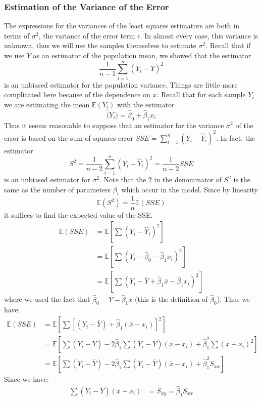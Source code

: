 \documentclass[12pt]{article}
\theoremstyle{definition}
\theoremstyle{remark}
\def\E{{\mathbb E}}
\begin{document}
\subsubsection{Estimation of the Variance of the Error}
The expressions for the variances of the least squares estimators are both in terms of $\sigma^2$, the variance of the error term $\epsilon$. In almost every case, this variance is unknown, thus we will use the samples themselves to estimate $\sigma^2$. Recall that if we use $\bar{Y}$ as an estimator of the population mean, we showed that the estimator
\[
\frac{1}{n-1} \sum_{i=1}^n (Y_i - \bar{Y})^2
\] 
is an unbiased estimator for the population variance. Things are little more complicated here because of the dependence on $x$. Recall that for each sample $Y_i$ we are estimating the mean $\E(Y_i)$ with the estimator
\[
\hat(Y_i) = \hat{\beta}_0 + \hat{\beta}_1 x_i
\]
Thus it seems reasonable to suppose that an estimator for the variance $\sigma^2$ of the error is based on the sum of squares error $SSE = \sum_{i=1}^n (Y_i - \hat{Y}_i)^2$. In fact, the estimator
\[
S^2 = \frac{1}{n-2} \sum_{i=1}^n (Y_i - \hat{Y}_i)^2 = \frac{1}{n-2} SSE
\]
is an unbiased estimator for $\sigma^2$. Note that the 2 in the denominator of $S^2$ is the same as the number of parameters $\beta_i$ which occur in the model. Since by linearity
\[
\E(S^2) = \frac{1}{n} \E(SSE)
\]
it suffices to find the expected value of the SSE.
\begin{align*}
\E(SSE) &= \E \left[ \sum (Y_i - \hat{Y}_i)^2 \right] \\
&= \E \left[ \sum (Y_i - \hat{\beta}_0 - \hat{\beta}_1 x_i)^2 \right] \\
&= \E \left[ \sum (Y_i - \bar{Y} + \hat{\beta}_1 \bar{x} - \hat{\beta}_1 x_i)^2 \right]
\end{align*}
where we used the fact that $\hat{\beta}_0 = \bar{Y} - \hat{\beta}_1 \bar{x}$ (this is the definition of $\hat{\beta}_0$). Thus we have:
\begin{align*}
\E(SSE) &= \E \left[ \sum [(Y_i - \bar{Y}) + \hat{\beta}_1( \bar{x} - x_i)]^2 \right]\\
&= \E\left[ \sum(Y_i - \bar{Y}) - 2 \hat{\beta}_1 \sum(Y_i - \bar{Y})( \bar{x} - x_i) + \hat{\beta}_1^2\sum( \bar{x} - x_i)^2  \right] \\
&= \E\left[ \sum(Y_i - \bar{Y}) - 2 \hat{\beta}_1 \sum(Y_i - \bar{Y})( \bar{x} - x_i) + \hat{\beta}_1^2 S_{xx} \right]
\end{align*}
Since we have:
\begin{align*}
\sum(Y_i - \bar{Y})( \bar{x} - x_i) &= S_{xy} = \hat{\beta}_1 S_{xx}
\end{align*}
\end{document}
